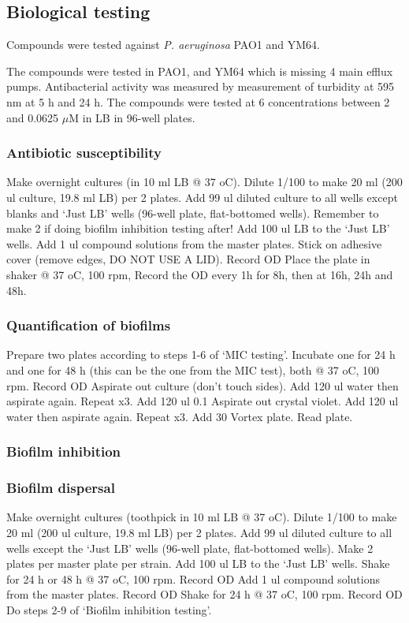 \subsection{Biological testing}

Compounds were tested against \textit{P. aeruginosa} PAO1\cite{bibid} and YM64\cite{bibid}.

The compounds were tested in PAO1, and YM64 which is missing 4 main efflux pumps.
Antibacterial activity was measured by measurement of turbidity at 595 nm at 5 h and 24 h.
The compounds were tested at 6 concentrations between 2 and 0.0625 $\mu$M in LB in 96-well plates.

\subsubsection{Antibiotic susceptibility}

Make overnight cultures (in 10 ml LB @ 37 oC).
Dilute 1/100 to make 20 ml (200 ul culture, 19.8 ml LB) per 2 plates.
Add 99 ul diluted culture to all wells except blanks and ‘Just LB’ wells (96-well plate, flat-bottomed wells). Remember to make 2 if doing biofilm inhibition testing after!
Add 100 ul LB to the ‘Just LB’ wells.
Add 1 ul compound solutions from the master plates.
Stick on adhesive cover (remove edges, DO NOT USE A LID).
Record OD
Place the plate in shaker @ 37 oC, 100 rpm, 
Record the OD every 1h for 8h, then at 16h, 24h and 48h.

\subsubsection{Quantification of biofilms}

Prepare two plates according to steps 1-6 of ‘MIC testing’.
Incubate one for 24 h and one for 48 h (this can be the one from the MIC test), both @ 37 oC, 100 rpm.
Record OD
Aspirate out culture (don’t touch sides).
Add 120 ul water then aspirate again. Repeat x3.
Add 120 ul 0.1 %
Aspirate out crystal violet.
Add 120 ul water then aspirate again. Repeat x3.
Add 30 %
Vortex plate.
Read plate.

\subsubsection{Biofilm inhibition}

\subsubsection{Biofilm dispersal}

Make overnight cultures (toothpick in 10 ml LB @ 37 oC).
Dilute 1/100 to make 20 ml (200 ul culture, 19.8 ml LB) per 2 plates.
Add 99 ul diluted culture to all wells except the ‘Just LB’ wells (96-well plate, flat-bottomed wells). Make 2 plates per master plate per strain.
Add 100 ul LB to the ‘Just LB’ wells.
Shake for 24 h or 48 h @ 37 oC, 100 rpm.
Record OD
Add 1 ul compound solutions from the master plates.
Record OD
Shake for 24 h @ 37 oC, 100 rpm.
Record OD
Do steps 2-9 of ‘Biofilm inhibition testing’.
